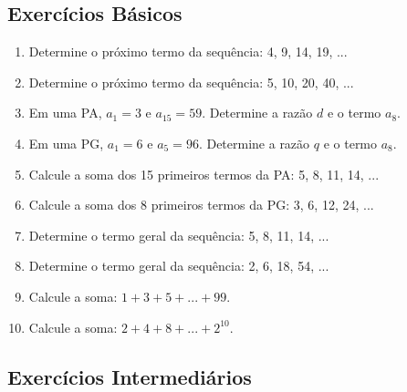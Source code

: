 \documentclass[12pt,a4paper]{article}
\begin{document}
\subsection{Exercícios Básicos}

\begin{enumerate}
    \item Determine o próximo termo da sequência: 4, 9, 14, 19, ...
    
    \item Determine o próximo termo da sequência: 5, 10, 20, 40, ...
    
    \item Em uma PA, $a_1 = 3$ e $a_{15} = 59$. Determine a razão $d$ e o termo $a_8$.
    
    \item Em uma PG, $a_1 = 6$ e $a_5 = 96$. Determine a razão $q$ e o termo $a_8$.
    
    \item Calcule a soma dos 15 primeiros termos da PA: 5, 8, 11, 14, ...
    
    \item Calcule a soma dos 8 primeiros termos da PG: 3, 6, 12, 24, ...
    
    \item Determine o termo geral da sequência: 5, 8, 11, 14, ...
    
    \item Determine o termo geral da sequência: 2, 6, 18, 54, ...
    
    \item Calcule a soma: $1 + 3 + 5 + ... + 99$.
    
    \item Calcule a soma: $2 + 4 + 8 + ... + 2^{10}$.
\end{enumerate}

\subsection{Exercícios Intermediários}
\end{document}

